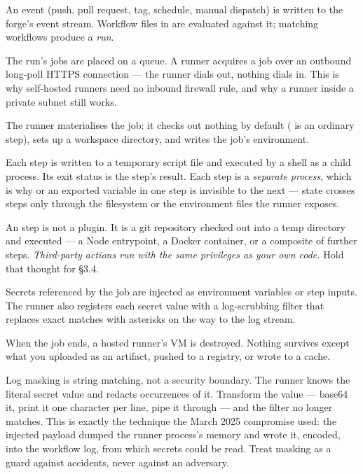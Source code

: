 \begin{wbitem}
  \item An event (push, pull request, tag, schedule, manual dispatch) is written to the forge's event stream. Workflow files in  are evaluated against it; matching workflows produce a \emph{run}.
  \item The run's jobs are placed on a queue. A runner acquires a job over an outbound long-poll HTTPS connection --- the runner dials out, nothing dials in. This is why self-hosted runners need no inbound firewall rule, and why a runner inside a private subnet still works.
  \item The runner materialises the job: it checks out nothing by default ( is an ordinary step), sets up a workspace directory, and writes the job's environment.
  \item Each  step is written to a temporary script file and executed by a shell as a child process. Its exit status is the step's result. Each step is a \emph{separate process}, which is why  or an exported variable in one step is invisible to the next --- state crosses steps only through the filesystem or the environment files the runner exposes.
  \item An  step is not a plugin. It is a git repository checked out into a temp directory and executed --- a Node entrypoint, a Docker container, or a composite of further steps. \emph{Third-party actions run with the same privileges as your own code.} Hold that thought for \S3.4.
  \item Secrets referenced by the job are injected as environment variables or step inputs. The runner also registers each secret value with a log-scrubbing filter that replaces exact matches with asterisks on the way to the log stream.
  \item When the job ends, a hosted runner's VM is destroyed. Nothing survives except what you uploaded as an artifact, pushed to a registry, or wrote to a cache.
\end{wbitem}

\begin{behind}
Log masking is string matching, not a security boundary. The runner knows the literal secret value and redacts occurrences of it. Transform the value --- base64 it, print it one character per line, pipe it through  --- and the filter no longer matches. This is exactly the technique the March 2025  compromise used: the injected payload dumped the runner process's memory and wrote it, encoded, into the workflow log, from which secrets could be read. Treat masking as a guard against accidents, never against an adversary.
\end{behind}


